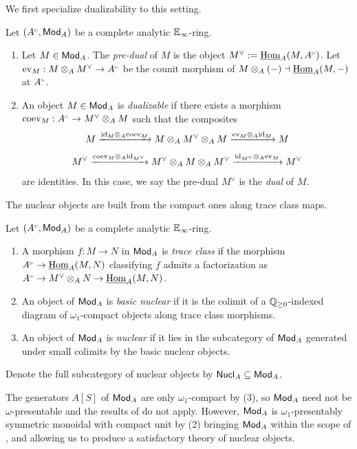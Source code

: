We first specialize dualizability to this setting.
\begin{definition}\label{def: dualizability}
    Let $(A^{\tri},\Mod_{A})$ be a complete analytic $\mathbb{E}_{\infty}$-ring.
    \begin{enumerate}
        \item Let $M\in\mathsf{Mod}_{A}$. The \emph{pre-dual} of $M$ is the object $M^{\vee}:=\intHom_{A}(M, A^{\tri})$. Let $\ev_{M}:M\otimes_{A}M^{\vee}\to A^{\tri}$ be the counit morphism of $M\otimes_{A}(-)\dashv\underline{\mathrm{Hom}}_{A}(M, -)$ at $A^{\tri}$.  
        \item An object $M\in\mathsf{Mod}_{A}$ is \emph{dualizable} if there exists a morphism $\coev_{M}:A^{\tri}\to M^{\vee}\otimes_{A}M$ such that the composites 
        $$M\xrightarrow{\mathrm{id}_{M}\otimes_{A}\mathrm{coev}_{M}}M\otimes_{A}M^{\vee}\otimes_{A}M\xrightarrow{\mathrm{ev}_{M}\otimes_{A}\mathrm{id}_{M}}M$$
        $$M^{\vee}\xrightarrow{\mathrm{coev}_{M}\otimes_{A}\mathrm{id}_{M^{\vee}}}M^{\vee}\otimes_{A}M\otimes_{A}M^{\vee}\xrightarrow{\mathrm{id}_{M^{\vee}}\otimes_{A}\mathrm{ev}_{M}}M^{\vee}$$
        are identities. In this case, we say the pre-dual $M^{\vee}$ is the \emph{dual} of $M$. 
    \end{enumerate}
\end{definition}
The nuclear objects are built from the compact ones along trace class maps.
\begin{definition}\label{def: nuclearity and trace class morphisms}
    Let $(A^{\tri},\Mod_{A})$ be a complete analytic $\mathbb{E}_{\infty}$-ring. 
    \begin{enumerate}
        \item A morphism $f:M\to N$ in $\mathsf{Mod}_{A}$ is \emph{trace class} if the morphism $A^{\tri}\to\intHom_{A}(M, N)$ classifying $f$ admits a factorization as $A^{\tri}\to M^{\vee}\otimes_{A}N\to\intHom_{A}(M,N)$. 
        \item An object of $\mathsf{Mod}_{A}$ is \emph{basic nuclear} if it is the colimit of a $\mathbb{Q}_{\geq0}$-indexed diagram of $\omega_{1}$-compact objects along trace class morphisms. 
        \item An object of $\mathsf{Mod}_{A}$ is \emph{nuclear} if it lies in the subcategory of $\mathsf{Mod}_{A}$ generated under small colimits by the basic nuclear objects. 
    \end{enumerate}
    Denote the full subcategory of nuclear objects by $\mathsf{Nucl}_{A}\subseteq\mathsf{Mod}_{A}$. 
\end{definition}
\begin{remark}\label{rmk: nuclear objects}
    The generators $A[S]$ of $\mathsf{Mod}_{A}$ are only $\omega_{1}$-compact by  (3), so $\mathsf{Mod}_{A}$ need not be $\omega$-presentable and the results of \cite[Lecture VIII]{Complex} do not apply. However, $\mathsf{Mod}_{A}$ is $\omega_{1}$-presentably symmetric monoidal with compact unit by  (2) bringing $\mathsf{Mod}_{A}$ within the scope of , and allowing us to produce a satisfactory theory of nuclear objects.
\end{remark}

